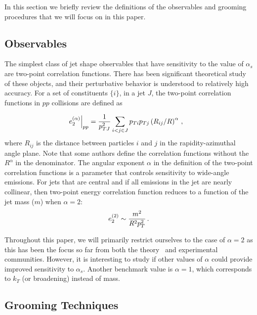 
In this section we briefly review the definitions of the observables and grooming procedures that we will focus on in this paper.


\subsection{Observables}\label{sec:shape_def}


The simplest class of jet shape observables that have sensitivity to the value of $\alpha_s$ are two-point correlation functions. There has been significant theoretical study of these objects, and their perturbative behavior is understood to relatively high accuracy. For a set of constituents $\{i\}$, in a jet $J$, the two-point correlation functions in $pp$ collisions are defined as

\begin{align}\label{eq:ppe2}
\left.e_{2}^{(\alpha)}\right|_{pp}&=\frac{1}{p_{TJ}^2}\sum_{i<j\in J} p_{Ti} p_{Tj}\left(R_{ij}/R\right)^\alpha\,, 
\end{align}
where $R_{ij}$ is the distance between particles $i$
and $j$ in the rapidity-azimuthal angle plane.   Note that some authors define the correlation functions without the $R^\alpha$ in the denominator.  The angular exponent $\alpha$ in the definition of the two-point correlation functions is a parameter that controls sensitivity to wide-angle emissions. For jets that are central and if all emissions in the jet are nearly collinear, then two-point energy correlation function reduces to a function of the jet mass ($m$) when $\alpha=2$:
\begin{equation}
e_{2}^{(2)} \sim \frac{m^2}{R^2p_{T}^2}\,.
\end{equation} 

Throughout this paper, we will primarily restrict ourselves to the
case of $\alpha=2$ as this has been the focus so far from both the theory~\cite{Frye:2016okc,Frye:2016aiz,Marzani:2017kqd,Marzani:2017mva} and experimental~\cite{Aaboud:2017qwh,CMS-PAS-SMP-16-010} communities.  However, it is interesting
to study if other values of $\alpha$ could provide improved
sensitivity to $\alpha_s$. Another benchmark value is $\alpha=1$,
which corresponds to $k_T$ (or broadening) instead of mass.


\subsection{Grooming Techniques}\label{sec:groom_tech}

